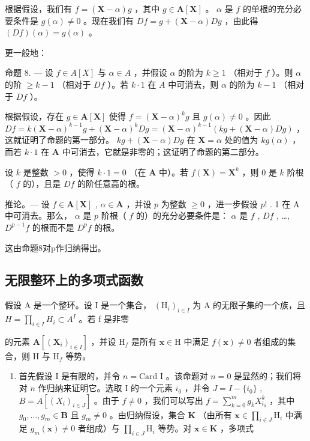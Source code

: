 根据假设，我们有 \(f = (\mathbf{X} - \alpha)g\) ，其中 \(g \in \mathbf{A}[\mathbf{X}]\) 。 \(\alpha\) 是 \(f\) 的单根的充分必要条件是 \(g(\alpha) \neq 0\) 。现在我们有 \(Df = g + (\mathbf{X} - \alpha)Dg\) ，由此得 \((Df)(\alpha) = g(\alpha)\) 。

更一般地：

命题 8. --- 设 \(f \in A[X]\) 与 \(\alpha \in A\) ，并假设 \(\alpha\) 的阶为 \(k \geqslant 1\) （相对于 \(f\) ）。则 \(\alpha\) 的阶 \(\geqslant k - 1\) （相对于 \(Df\) ）。若 \(k \cdot 1\) 在 \(A\) 中可消去，则 \(\alpha\) 的阶为 \(k - 1\) （相对于 \(Df\) ）。

根据假设，存在 \(g \in \mathbf{A}[\mathbf{X}]\) 使得 \(f = (\mathbf{X} - \alpha)^k g\) 且 \(g(\alpha) \neq 0\) 。因此 \(Df = k(\mathbf{X} - \alpha)^{k-1}g + (\mathbf{X} - \alpha)^k Dg = (\mathbf{X} - \alpha)^{k-1}(kg + (\mathbf{X} - \alpha)Dg)\) ，这就证明了命题的第一部分。 \(kg + (\mathbf{X} - \alpha)Dg\) 在 \(\mathbf{X} = \alpha\) 处的值为 \(kg(\alpha)\) ，而若 \(k \cdot 1\) 在 \(\mathbf{A}\) 中可消去，它就是非零的；这证明了命题的第二部分。

设 \(k\) 是整数 \(> 0\) ，使得 \(k \cdot 1 = 0\) （在 \(\mathbf{A}\) 中）。若 \(f(\mathbf{X}) = \mathbf{X}^k\) ，则 \(0\) 是 \(k\) 阶根（ \(f\) 的），且是 \(Df\) 的阶任意高的根。

推论。--- 设 \(f \in \mathbf{A}[\mathbf{X}]\) , \(\alpha \in \mathbf{A}\) ，并设 \(p\) 为整数 \(\geqslant 0\) ，进一步假设 \(p!\) . 1 在 A 中可消去。那么， \(\alpha\) 是 \(p\) 阶根（ \(f\) 的）的充分必要条件是： \(\alpha\) 是 \(f\) , \(Df\) , \ldots, \(D^{p-1}f\) 的根而不是 \(D^p f\) 的根。

这由命题8对p作归纳得出。

\subsection{无限整环上的多项式函数}

假设 A 是一个整环。设 I 是一个集合， \((\mathrm{H}_{i})_{i\in I}\) 为 A 的无限子集的一个族，且 \(H=\prod_{i\in I}H_{i}\subset A^{I}\) 。若 f 是非零

的元素 \(\mathbf{A}[(\mathbf{X}_i)_{i\in I}]\) ，并设 \(\mathrm{H}_f\) 是所有 \(\mathbf{x}\in \mathrm{H}\) 中满足 \(f(\mathbf{x})\neq 0\) 者组成的集合，则 \(\mathrm{H}\) 与 \(\mathrm{H}_f\) 等势。

\begin{enumerate}
\def\labelenumi{\alph{enumi})}
\tightlist
\item
  首先假设 I 是有限的，并令 \(n = \text{Card I}\) 。该命题对 \(n = 0\) 是显然的；我们将对 \(n\) 作归纳来证明它。选取 I 的一个元素 \(i_0\) ，并令 \(J = I - \{i_0\}\) , \(B = A[(X_i)_{i \in J}]\) 。由于 \(f \neq 0\) ，我们可以写出 \(f = \sum_{k=0}^{m} g_k X_{i_0}^k\) ，其中 \(g_0, \ldots, g_m \in \mathbf{B}\) 且 \(g_m \neq 0\) 。由归纳假设，集合 \(\mathbf{K}\) （由所有 \(\mathbf{x} \in \prod_{i \in J} \mathrm{H}_i\) 中满足 \(g_m(\mathbf{x}) \neq 0\) 者组成）与 \(\prod_{i \in J} \mathrm{H}_i\) 等势。对 \(\mathbf{x} \in \mathbf{K}\) ，多项式
\end{enumerate}

